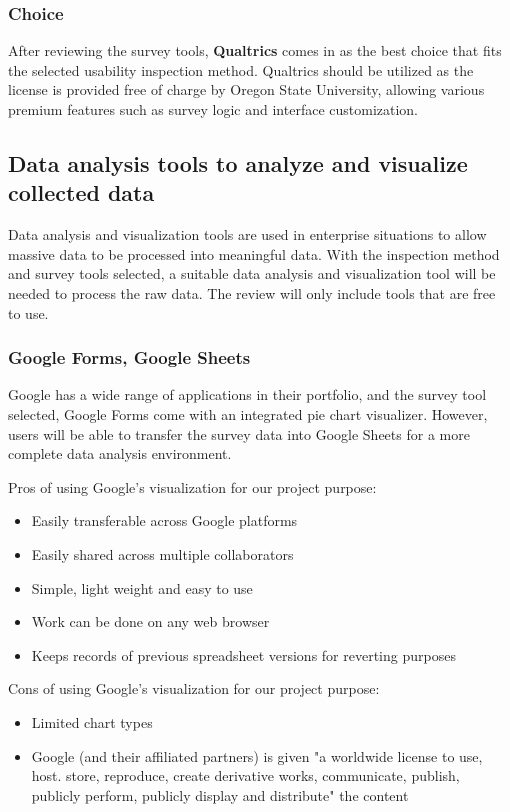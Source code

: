 \documentclass[10pt,journal,compsoc,draftclsnofoot]{IEEEtran}
\begin{document}
\subsubsection{Choice}
After reviewing the survey tools, \textbf{Qualtrics} comes in as the best choice that fits the selected usability inspection method.
Qualtrics should be utilized as the license is provided free of charge by Oregon State University, allowing various premium features such as survey logic and interface customization. 
\newpage

\subsection{Data analysis tools to analyze and visualize collected data}
Data analysis and visualization tools are used in enterprise situations to allow massive data to be processed into meaningful data.
With the inspection method and survey tools selected, a suitable data analysis and visualization tool will be needed to process the raw data.
The review will only include tools that are free to use.

\subsubsection{Google Forms, Google Sheets}
Google has a wide range of applications in their portfolio, and the survey tool selected, Google Forms come with an integrated pie chart visualizer.
However, users will be able to transfer the survey data into Google Sheets for a more complete data analysis environment.

Pros of using Google's visualization for our project purpose:
\begin{itemize}
\item Easily transferable across Google platforms
\item Easily shared across multiple collaborators
\item Simple, light weight and easy to use
\item Work can be done on any web browser
\item Keeps records of previous spreadsheet versions for reverting purposes
\end{itemize}

Cons of using Google's visualization for our project purpose:
\begin{itemize}
\item Limited chart types
\item Google (and their affiliated partners) is given "a worldwide license to use, host. store, reproduce, create derivative works, communicate, publish, publicly perform, publicly display and distribute" the content \cite{google}
\end{itemize}
\end{document}
